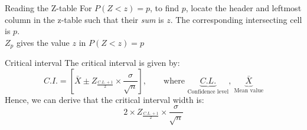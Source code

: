 \documentclass{article}
\begin{document}
\begin{knBox}[]{Reading the Z-table}
    For $P(Z<z)=p$, to find $p$, locate the header and leftmost column in the z-table such that their \emph{sum} is $z$. The corresponding intersecting cell is $p$.\\
    $Z_p$ gives the value $z$ in $P(Z<z)=p$
\end{knBox}
\begin{propBox}[]{Critical interval}
    The critical interval is given by:
    \[C.I.=[\bar{X}\pm Z_{\frac{C.L.+1}{2}}\times\frac{\sigma}{\sqrt{n}}],\quad\quad\text{where }\underbrace{C.L.}_{\text{Confidence level}},\ \underbrace{\bar{X}}_{\text{Mean value}}\]
    Hence, we can derive that the critical interval width is:
    \[2\times Z_{\frac{C.L.+1}{2}}\times\frac{\sigma}{\sqrt{n}}\]
\end{propBox}
\end{document}
